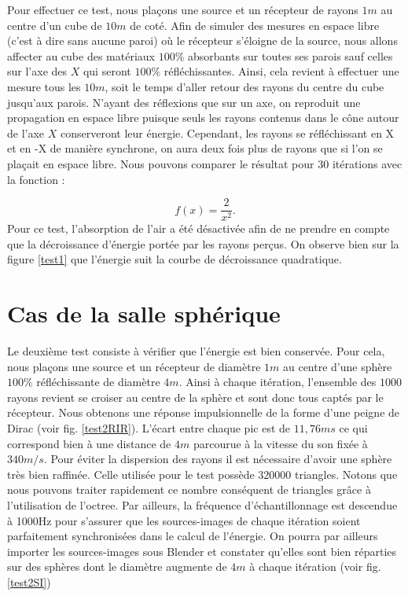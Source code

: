 Pour effectuer ce test, nous plaçons une source et un récepteur de rayons $1m$ au centre d'un cube de $10m$ de coté. Afin de simuler des mesures en espace libre (c'est à dire sans aucune paroi) où le récepteur s'éloigne de la source, nous allons affecter au cube des matériaux $100\%$ absorbants sur toutes ses parois sauf celles sur l'axe des $X$ qui seront $100\%$ réfléchissantes. Ainsi, cela revient à effectuer une mesure tous les $10m$, soit le temps d'aller retour des rayons du centre du cube jusqu'aux parois. N'ayant des réflexions que sur un axe, on reproduit une propagation en espace libre puisque seuls les rayons contenus dans le cône autour de l'axe $X$ conserveront leur énergie. Cependant, les rayons se réfléchissant en X et en -X de manière synchrone, on aura deux fois plus de rayons que si l'on se plaçait en espace libre. Nous pouvons comparer le résultat pour 30 itérations avec la fonction :

\begin{equation*}
f(x) = \frac{2}{x^2}.
\end{equation*}
Pour ce test, l'absorption de l'air a été désactivée afin de ne prendre en compte que la décroissance d'énergie portée par les rayons perçus. On observe bien sur la figure \ref{test1} que l'énergie suit la courbe de décroissance quadratique.
 		
		
\section{Cas de la salle sphérique}

Le deuxième test consiste à vérifier que l'énergie est bien conservée. Pour cela, nous plaçons une source et un récepteur de diamètre $1m$ au centre d'une sphère $100\%$ réfléchissante de diamètre $4m$. Ainsi à chaque itération, l'ensemble des $1000$ rayons revient se croiser au centre de la sphère et sont donc tous captés par le récepteur. Nous obtenons une réponse impulsionnelle de la forme d'une peigne de Dirac (voir fig. \ref{test2RIR}). L'écart entre chaque pic est de $11,76 ms$ ce qui correspond bien à une distance de $4m$ parcourue à la vitesse du son fixée à $340m/s$. Pour éviter la dispersion des rayons il est nécessaire d'avoir une sphère très bien raffinée. Celle utilisée pour le test possède $320000$ triangles. Notons que nous pouvons traiter rapidement ce nombre conséquent de triangles grâce à l'utilisation de l'\gls{octree}. Par ailleurs, la fréquence d'échantillonnage est descendue à 1000Hz pour s'assurer que les sources-images de chaque itération soient parfaitement synchronisées dans le calcul de l'énergie. On pourra par ailleurs importer les sources-images sous Blender et constater qu'elles sont bien réparties sur des sphères dont le diamètre augmente de $4m$ à chaque itération (voir fig. \ref{test2SI})

